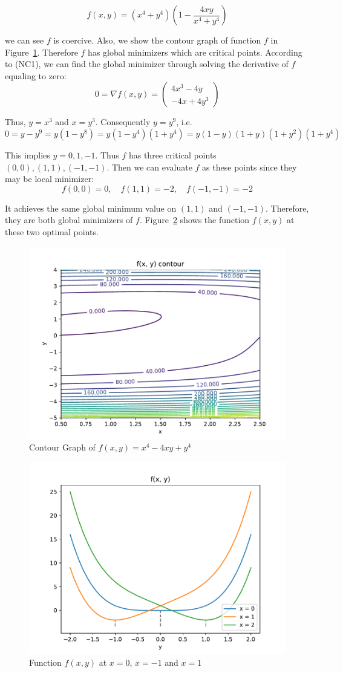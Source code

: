 $$
f(x, y)=\left(x^{4}+y^{4}\right)\left(1-\frac{4 x y}{x^{4}+y^{4}}\right)
$$
\par we can see $f$ is coercive. Also, we show the contour graph of function $f$ in Figure~\ref{fig:unconseg}. Therefore $f$ has global minimizers which are critical points. According to (NC1), we can find the global minimizer through solving the derivative of $f$ equaling to zero:
$$
0=\nabla f(x, y)=\left(\begin{array}{c}4 x^{3}-4 y \\ -4 x+4 y^{3}\end{array}\right)
$$
\par Thus, $y = x^3$ and $x = y^3$. Consequently $y = y^9$, i.e.
$$
0=y-y^{9}=y\left(1-y^{8}\right)=y\left(1-y^{4}\right)\left(1+y^{4}\right)=y(1-y)(1+y)\left(1+y^{2}\right)\left(1+y^{4}\right)
$$
\par This implies $y = 0, 1, -1$. Thus $f$ has three critical points $(0,0), (1,1), (-1,-1)$. Then we can evaluate $f$ as these points since they may be local minimizer:
$$
f(0,0)=0, \quad f(1,1)=-2, \quad f(-1,-1)=-2
$$
\par It achieves the same global minimum value on $(1, 1)$ and $(-1, -1)$. Therefore, they are both global minimizers of $f$. Figure~\ref{fig:example12_solution} shows the function $f(x,y)$ at these two optimal points. 
\begin{figure}[t]
\label{fig:unconseg}
\centering
    \includegraphics[page=1,width=.7\columnwidth]{figs/contour_21.pdf}
\caption{Contour Graph of $f(x, y)=x^{4}-4 x y+y^{4}$}
\end{figure}
\begin{figure}[t]
    \label{fig:example12_solution}
    \centering
    \includegraphics[page=1,width=.7\columnwidth]{figs/solution_21.pdf} 
  \caption{Function $f(x,y)$ at $x = 0$, $x=-1$ and $x=1$ }
 \end{figure}

